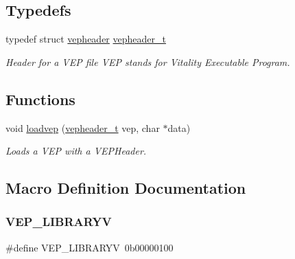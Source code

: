 \subsection*{Typedefs}
\begin{DoxyCompactItemize}
\item 
typedef struct \hyperlink{a00080}{vepheader} \hyperlink{a00062_a78392c340e1fe1be344df81d1438b74f_a78392c340e1fe1be344df81d1438b74f}{vepheader\+\_\+t}
\begin{DoxyCompactList}\small\item\em Header for a V\+EP file V\+EP stands for Vitality Executable Program. \end{DoxyCompactList}\end{DoxyCompactItemize}
\subsection*{Functions}
\begin{DoxyCompactItemize}
\item 
void \hyperlink{a00062_afa2deaad59ce4809eed53e7aeb3ac31b_afa2deaad59ce4809eed53e7aeb3ac31b}{loadvep} (\hyperlink{a00062_a78392c340e1fe1be344df81d1438b74f_a78392c340e1fe1be344df81d1438b74f}{vepheader\+\_\+t} vep, char $\ast$data)
\begin{DoxyCompactList}\small\item\em Loads a V\+EP with a V\+E\+P\+Header. \end{DoxyCompactList}\end{DoxyCompactItemize}


\subsection{Macro Definition Documentation}
\mbox{\label{a00062_a269ec657dd35349b74056083e6ba09c0_a269ec657dd35349b74056083e6ba09c0}} 
\subsubsection{\texorpdfstring{V\+E\+P\+\_\+\+L\+I\+B\+R\+A\+R\+YV}{VEP\_LIBRARYV}}
{\footnotesize\ttfamily \#define V\+E\+P\+\_\+\+L\+I\+B\+R\+A\+R\+YV~0b00000100}



